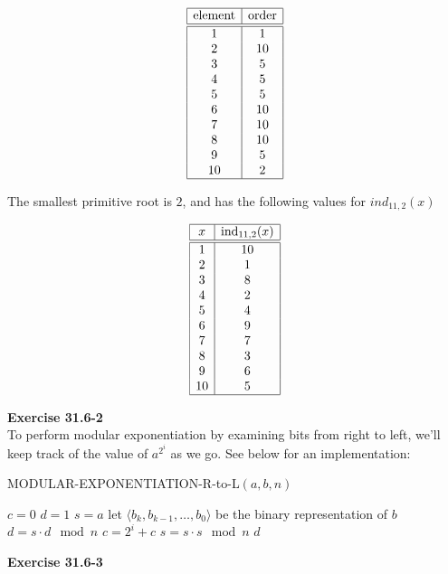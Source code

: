 \documentclass{article}
\begin{document}
\[
\begin{array}{|c|c|}
\hline
\hbox{element}&\hbox{order}\\
\hline
\hline
1&1\\
2& 10\\
3& 5\\
4& 5\\
5& 5\\
6& 10\\
7& 10\\
8& 10\\
9& 5\\
10& 2\\
\hline
\end{array}
\]

The smallest primitive root is $2$, and has the following values for $ind_{11,2}(x)$

\[
\begin{array}{|c|c|}
\hline
x&\hbox{ind}_{11,2}(x)\\
\hline
\hline
1& 10\\
2& 1\\
3& 8\\
4& 2\\
5& 4\\
6& 9\\
7& 7\\
8& 3\\
9& 6\\
10&5 \\
\hline
\end{array}
\]

\noindent\textbf{Exercise 31.6-2}\\

To perform modular exponentiation by examining bits from right to left, we'll keep track of the value of $a^{2^i}$ as we go.  See below for an implementation:\\

\begin{algorithm}
\caption{MODULAR-EXPONENTIATION-R-to-L$(a,b,n)$}
\begin{algorithmic}
\State $c=0$
\State $d=1$
\State $s = a$
\State let $\langle b_k, b_{k-1}, \ldots, b_0 \rangle$ be the binary representation of $b$
		\State $d = s\cdot d \mod n$
		\State $c = 2^{i} + c$
	\EndIf
	\State $s = s \cdot s \mod n$
\EndFor
\State \Return $d$
\end{algorithmic}
\end{algorithm}

\noindent\textbf{Exercise 31.6-3}\\
\end{document}
